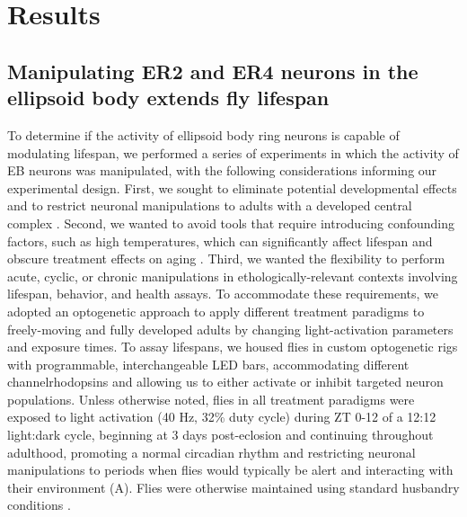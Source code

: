 \section*{Results}

\subsection*{Manipulating ER2 and ER4 neurons in the ellipsoid body extends fly lifespan}

To determine if the activity of ellipsoid body ring neurons is capable of modulating lifespan, we performed a series of experiments in which the activity of EB neurons was manipulated, with the following considerations informing our experimental design. 
First, we sought to eliminate potential developmental effects and to restrict neuronal manipulations to adults with a developed central complex \citep{lovick2017}. 
Second, we wanted to avoid tools that require introducing confounding factors, such as high temperatures, which can significantly affect lifespan and obscure treatment effects on aging \citep{miquel1976}. 
Third, we wanted the flexibility to perform acute, cyclic, or chronic manipulations in ethologically-relevant contexts involving lifespan, behavior, and health assays. 
To accommodate these requirements, we adopted an optogenetic \citep{govorunova2015} approach to apply different treatment paradigms to freely-moving and fully developed adults by changing light-activation parameters and exposure times. 
To assay lifespans, we housed flies in custom optogenetic rigs with programmable, interchangeable LED bars, accommodating different channelrhodopsins and allowing us to either activate \citep{klapoetke2014} or inhibit \citep{mohammad2017} targeted neuron populations. 
Unless otherwise noted, flies in all treatment paradigms were exposed to light activation (40 Hz, 32\% duty cycle) during ZT 0-12 of a 12:12 light:dark cycle, beginning at 3 days post-eclosion and continuing throughout adulthood, promoting a normal circadian rhythm and restricting neuronal manipulations to periods when flies would typically be alert and interacting with their environment (A).
Flies were otherwise maintained using standard husbandry conditions \citep{linford2013}. 

